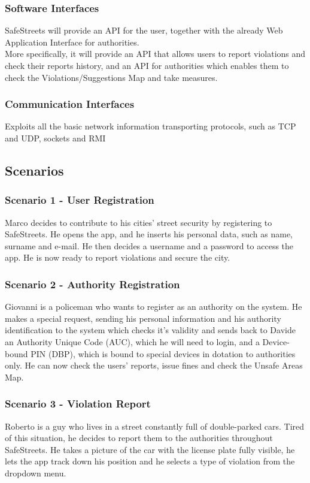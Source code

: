 \documentclass[12pt,a4paper]{article}
\begin{document}
\subsubsection{Software Interfaces}
SafeStreets will provide an API for the user, together with the already Web Application Interface for authorities.\\
		More specifically, it will provide an API that allows users to report violations and check their reports history, and an API for authorities which enables them to check the Violations/Suggestions Map and take measures.
\subsubsection{Communication Interfaces}
Exploits all the basic network information transporting protocols, such as TCP and UDP, sockets and RMI \\
	\newpage
\subsection{Scenarios}
\subsubsection*{Scenario 1 - User Registration}
Marco decides to contribute to his cities' street security by registering to SafeStreets. He opens the app, and he inserts his personal data, such as name, surname and e-mail. He then decides a username and a password to access the app. He is now ready to report violations and secure the city.
\subsubsection*{Scenario 2 - Authority Registration}
Giovanni is a policeman who wants to register as an authority on the system. He makes a special request, sending his personal information and his authority identification to the system which checks it's validity and sends back to Davide an Authority Unique Code (AUC), which he will need to login, and a Device-bound PIN (DBP), which is bound to special devices in dotation to authorities only. He can now check the users' reports, issue fines and check the Unsafe Areas Map. 
\subsubsection*{Scenario 3 - Violation Report}
Roberto is a guy who lives in a street constantly full of double-parked cars. Tired of this situation, he decides to report them to the authorities throughout SafeStreets. He takes a picture of the car with the license plate fully visible, he lets the app track down his position and he selects a type of violation from the dropdown menu.
\end{document}

